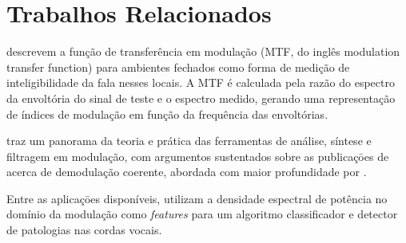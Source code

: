 \section{Trabalhos Relacionados}
\citet{houtgast1973} descrevem a função de transferência em modulação
(MTF, do inglês modulation
transfer function) para ambientes fechados como forma de medição de
inteligibilidade da fala nesses locais. A MTF é calculada pela razão do espectro
da envoltória do sinal de teste e o espectro medido, gerando uma representação
de índices de modulação em função da frequência das envoltórias.

\citet{schimmel2007} traz um panorama da teoria e prática das ferramentas de
análise, síntese e filtragem em modulação, com argumentos sustentados sobre as
publicaçōes de \citet{atlas2005, atlas2003} acerca de demodulação coerente,
abordada com maior profundidade por \citet{clark2012}.

Entre as aplicaçōes disponíveis, \citet{markaki2009} utilizam a densidade
espectral de potência no domínio da modulação como \textit{features} para um
algoritmo classificador e detector de patologias nas cordas vocais.